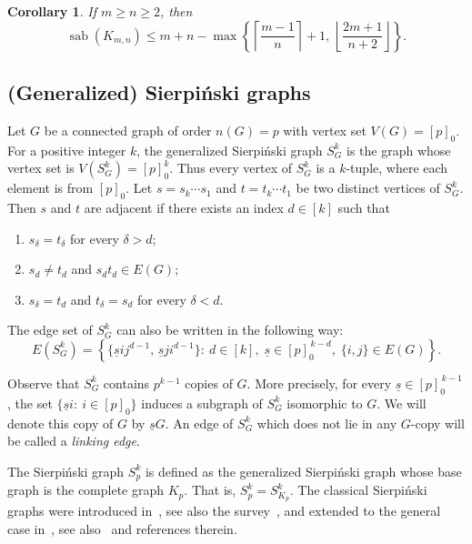 \documentclass[12pt]{article}
\newtheorem{corollary}[theorem]{Corollary}
\DeclareMathOperator{\sab}{\mathrm{sab}}
\begin{document}
\begin{corollary}
\label{cor:complete_bipartite_both}
If $m \ge n \ge 2$, then
$$\sab(K_{m,n}) \le m + n - \max\left\{\left\lceil\frac{m-1}{n}\right\rceil+1,\, \left\lfloor\frac{2m+1}{n+2}\right\rfloor \right\}.$$
\end{corollary}

\subsection{(Generalized) Sierpi\'nski graphs}
\label{sec:sierpinski}

Let $G$ be a connected graph of order $n(G)=p$ with vertex set $V(G)=[p]_0$. For a positive integer $k$, the generalized Sierpi\'nski graph $S^k_G$ is the graph whose vertex set is $V(S^k_G)=[p]^k_0$. Thus every vertex of $S^k_G$ is a $k$-tuple, where each element is from $[p]_0$. Let $s=s_k\cdots s_1$ and $t=t_k\cdots t_1$ be two distinct vertices of $S^k_G$. Then $s$ and $t$ are adjacent if there exists an index $d \in [k]$ such that

\begin{enumerate}
\item $s_\delta=t_\delta$ for every $\delta>d$;
\item $s_d\neq t_d$ and $s_dt_d \in E(G)$;
\item $s_\delta=t_d$ and $t_\delta=s_d$ for every $\delta<d$.
\end{enumerate}

\noindent The edge set of $S^k_G$ can also be written in the following way:
$$E(S^k_G)=\left\{\{\underline{s}ij^{d-1},\,\underline{s}ji^{d-1}\} :\ d\in[k],\; \underline{s}\in[p]_0^{\,k-d},\; \{i,j\}\in E(G)\right\}.$$

Observe that $S_G^k$ contains $p^{k-1}$ copies of $G$. More precisely, for every
$\underline{s}\in [p]_0^{\,k-1}$, the set $\{\underline{s}i :\ i\in [p]_0\}$ induces a subgraph of $S_G^k$ isomorphic to $G$. We will denote this copy of $G$ by $\underline{s}G$. An edge of $S_G^k$ which does not lie in any $G$-copy will be called a \emph{linking edge}.

The Sierpi\'nski graph $S^k_p$ is defined as the generalized Sierpi\'nski graph whose base graph is the complete graph $K_p$. That is, $S^k_p=S^k_{K_p}$. The classical Sierpi\'nski graphs were introduced in~\cite{klavzar-1997}, see also the survey~\cite{hinz-2017}, and extended to the general case in~\cite{gravier-2011}, see also~\cite{menon-2025} and references therein. 
\end{document}
